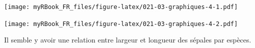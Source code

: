 \documentclass[]{book}
\newenvironment{Shaded}{\begin{snugshade}}{\end{snugshade}}
\newcommand{\CommentTok}[1]{\textcolor[rgb]{0.56,0.35,0.01}{\textit{#1}}}
\newcommand{\DataTypeTok}[1]{\textcolor[rgb]{0.13,0.29,0.53}{#1}}
\newcommand{\DecValTok}[1]{\textcolor[rgb]{0.00,0.00,0.81}{#1}}
\newcommand{\KeywordTok}[1]{\textcolor[rgb]{0.13,0.29,0.53}{\textbf{#1}}}
\newcommand{\NormalTok}[1]{#1}
\newcommand{\OperatorTok}[1]{\textcolor[rgb]{0.81,0.36,0.00}{\textbf{#1}}}
\newcommand{\StringTok}[1]{\textcolor[rgb]{0.31,0.60,0.02}{#1}}
\begin{document}
\texttt{[image: myRBook\_FR\_files/figure-latex/021-03-graphiques-4-1.pdf]}

\begin{Shaded}
\end{Shaded}

\texttt{[image: myRBook\_FR\_files/figure-latex/021-03-graphiques-4-2.pdf]}

Il semble y avoir une relation entre largeur et longueur des sépales par espèces.
\end{document}
